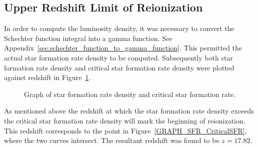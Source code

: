 		\subsection{Upper Redshift Limit of Reionization} %
		\label{sub:upper_redshift_limit_of_reionization}
			In order to compute the luminosity density, it was necessary to convert the Schechter function integral into a gamma function. See Appendix~\ref{sec:schechter_function_to_gamma_function}. This permitted the actual star formation rate density to be computed. Subsequently both star formation rate density and critical star formation rate density were plotted against redshift in Figure~\ref{fig:GRAPH_SFR_CriticalSFR}.
			\begin{figure}[htbp]
				\centering
					\begingroup{}
						\resizebox{0.8\textwidth}{!}{%
							
						}\endgroup
				\caption{Graph of star formation rate density and critical star formation rate.\label{fig:GRAPH_SFR_CriticalSFR}}
			\end{figure}

			As mentioned above the redshift at which the star formation rate density exceeds the critical star formation rate density will mark the beginning of reionization. This redshift corresponds to the point in Figure~\ref{GRAPH_SFR_CriticalSFR}, where the two curves intersect. The resultant redshift was found to be $z=17.82$.

